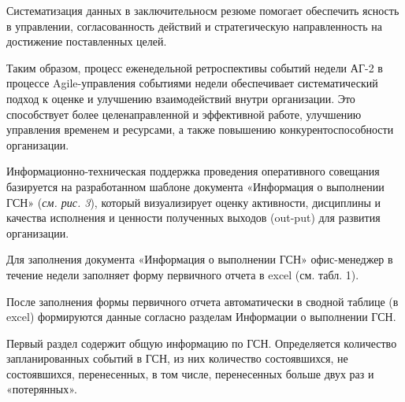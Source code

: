 \begin{multicols}{2}
Систематизация данных в заключительносм резюме помогает обеспечить
ясность в управлении, согласованность действий и стратегическую
направленность на достижение поставленных целей.

Таким образом, процесс еженедельной ретроспективы событий недели АГ-2 в
процессе Agile-управления событиями недели обеспечивает систематический
подход к оценке и улучшению взаимодействий внутри организации. Это
способствует более целенаправленной и эффективной работе, улучшению
управления временем и ресурсами, а также повышению конкурентоспособности
организации.

Информационно-техническая поддержка проведения оперативного совещания
базируется на разработанном шаблоне документа «Информация о выполнении
ГСН» (\emph{см. рис. 3}), который визуализирует оценку активности,
дисциплины и качества исполнения и ценности полученных выходов (out-put)
для развития организации.


Для заполнения документа «Информация о выполнении ГСН» офис-менеджер в
течение недели заполняет форму первичного отчета в excel (см. табл. 1).

После заполнения формы первичного отчета автоматически в сводной таблице
(в excel) формируются данные согласно разделам Информации о выполнении
ГСН.

Первый раздел содержит общую информацию по ГСН. Определяется количество
запланированных событий в ГСН, из них количество состоявшихся, не
состоявшихся, перенесенных, в том числе, перенесенных больше двух раз и
«потерянных».
\end{multicols}

